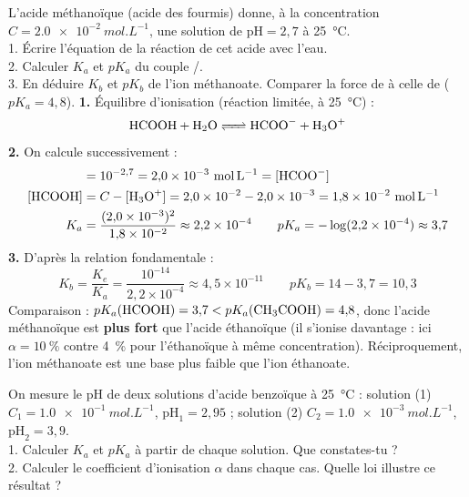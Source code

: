 \documentclass[11pt]{article}
\begin{document}
\begin{exoresolu}
L'acide méthanoïque  (acide des fourmis) donne, à la concentration $C = \SI{2,0e-2}{mol.L^{-1}}$, une solution de $\text{pH} = 2{,}7$ à \SI{25}{\celsius}.\\
1. Écrire l'équation de la réaction de cet acide avec l'eau.\\
2. Calculer $K_a$ et $pK_a$ du couple /.\\
3. En déduire $K_b$ et $pK_b$ de l'ion méthanoate. Comparer la force de  à celle de  ($pK_a = 4{,}8$).
\tcblower
\textbf{1.} Équilibre d'ionisation (réaction limitée, à \SI{25}{\celsius}) :
\[ \ce{HCOOH + H2O <=> HCOO- + H3O+} \]
\textbf{2.} On calcule successivement :
\begin{align*}
[\ce{H3O+}] &= 10^{-2{,}7} = 2{,}0\times 10^{-3}\ \si{mol.L^{-1}} = [\ce{HCOO-}] \\
[\ce{HCOOH}] &= C - [\ce{H3O+}] = 2{,}0\times 10^{-2} - 2{,}0\times 10^{-3} = 1{,}8\times 10^{-2}\ \si{mol.L^{-1}} \\
K_a &= \frac{(2{,}0\times 10^{-3})^2}{1{,}8\times 10^{-2}} \approx 2{,}2\times 10^{-4}
\qquad pK_a = -\log(2{,}2\times 10^{-4}) \approx 3{,}7
\end{align*}
\textbf{3.} D'après la relation fondamentale :
\[ K_b = \frac{K_e}{K_a} = \frac{10^{-14}}{2{,}2\times 10^{-4}} \approx 4{,}5\times 10^{-11} \qquad pK_b = 14 - 3{,}7 = 10{,}3 \]
Comparaison : $pK_a(\ce{HCOOH}) = 3{,}7 < pK_a(\ce{CH3COOH}) = 4{,}8$, donc l'acide méthanoïque est \textbf{plus fort} que l'acide éthanoïque (il s'ionise davantage : ici $\alpha = \SI{10}{\percent}$ contre \SI{4}{\percent} pour l'éthanoïque à même concentration). Réciproquement, l'ion méthanoate est une base plus faible que l'ion éthanoate.
\end{exoresolu}

\begin{exercice}[$pK_a$ et dilution]
On mesure le pH de deux solutions d'acide benzoïque  à \SI{25}{\celsius} : solution (1) $C_1 = \SI{1,0e-1}{mol.L^{-1}}$, $\text{pH}_1 = 2{,}95$ ; solution (2) $C_2 = \SI{1,0e-3}{mol.L^{-1}}$, $\text{pH}_2 = 3{,}9$.\\
1. Calculer $K_a$ et $pK_a$ à partir de chaque solution. Que constates-tu ?\\
2. Calculer le coefficient d'ionisation $\alpha$ dans chaque cas. Quelle loi illustre ce résultat ?
\end{exercice}
\end{document}
